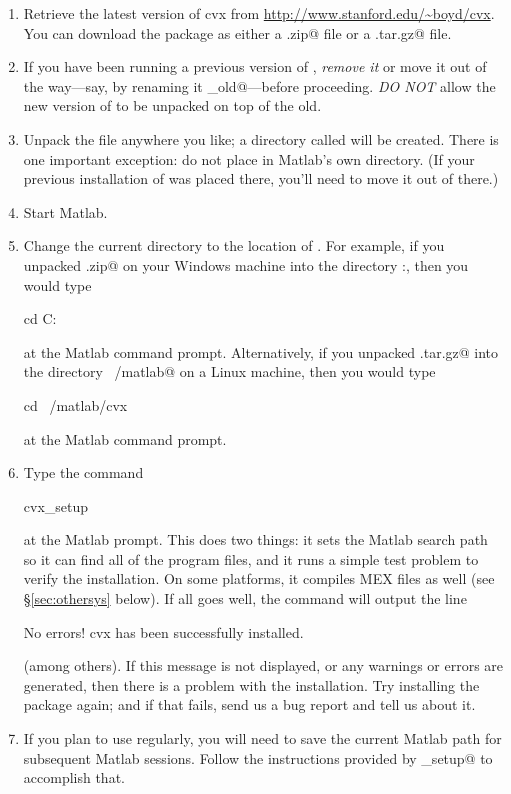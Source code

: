 \documentclass[12pt]{article}
\begin{document}
\begin{enumerate}
\item Retrieve the latest version of cvx from \url{http://www.stanford.edu/~boyd/cvx}.
You can download the package as either a \verb@.zip@ file or a \verb@.tar.gz@ 
file.
\item If you have been running a previous version of \cvx, \emph{remove it} or
move it out of the way---say, by renaming it \verb@cvx_old@---before proceeding.
\emph{DO NOT} allow the new version of \cvx to be unpacked on top of the old.
\item Unpack the file anywhere you like; a directory called \verb@cvx@ will be created.
There is one important exception: do not place \cvx in Matlab's own
\verb@toolbox@ directory. (If your previous installation of \cvx was placed
there, you'll need to move it out of there.)
\item Start Matlab.
\item Change the current directory to the location of \cvx.
For example, if you unpacked \verb@cvx.zip@ on your Windows machine into the
directory \verb@C:\Matlab\personal@, then you would type
\begin{code}
		cd C:\Matlab\personal\cvx
\end{code}
at the Matlab command prompt. Alternatively, if you unpacked \verb@cvx.tar.gz@
into the directory \verb@~/matlab@ on a Linux machine, then you would type
\begin{code}
		cd ~/matlab/cvx
\end{code}
at the Matlab command prompt.
\item Type the command
\begin{code}
		cvx_setup
\end{code}
at the Matlab prompt. This does two things: 
it sets the Matlab search path so it can find all of the \cvx program files,
and it runs a simple test problem to verify the installation. On some
platforms, it compiles MEX files as well (see \S\ref{sec:othersys} below).
If all goes well, the command will output the line
\begin{code}
	No errors! cvx has been successfully installed.
\end{code}
(among others). If this message is not displayed, or any warnings or errors are generated,
then there is a problem with the \cvx installation. Try installing the package
again; and if that fails, send us a bug report and tell us about it.
\item If you plan to use \cvx regularly, you will need to save the current
Matlab path for subsequent Matlab sessions. Follow the instructions provided
by \verb@cvx_setup@ to accomplish that.
\end{enumerate}
\end{document}
